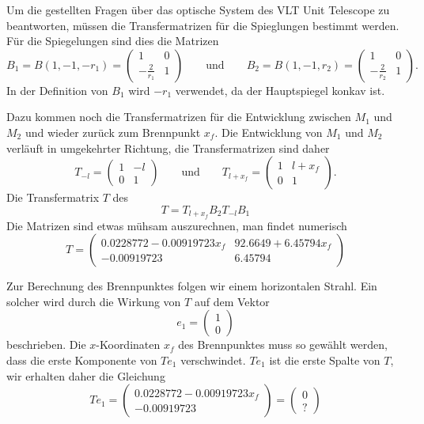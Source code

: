 \begin{loesung}
Um die gestellten Fragen über das optische System des VLT Unit Telescope
zu beantworten, müssen die Transfermatrizen für die Spieglungen 
bestimmt werden.
Für die Spiegelungen sind dies die Matrizen
\[
B_1=B(1,-1,-r_1)=
\begin{pmatrix}
1&0\\-\frac2{r_1}&1
\end{pmatrix}
\qquad\text{und}\qquad
B_2=B(1,-1,r_2)=
\begin{pmatrix}
1&0\\-\frac2{r_2}&1
\end{pmatrix}.
\]
In der Definition von $B_1$ wird $-r_1$ verwendet, da der Hauptspiegel
konkav ist.

Dazu kommen noch die Transfermatrizen für die Entwicklung zwischen 
$M_1$ und $M_2$ und wieder zurück zum Brennpunkt $x_f$.
Die Entwicklung von $M_1$ und $M_2$ verläuft in umgekehrter Richtung,
die Transfermatrizen sind daher
\[
T_{-l} = \begin{pmatrix} 1&-l\\0&1\end{pmatrix}
\qquad\text{und}\qquad
T_{l+x_f} = \begin{pmatrix} 1&l+x_f\\0&1\end{pmatrix}.
\]
Die Transfermatrix $T$ des 
\[
T
=
T_{l+x_f}B_2T_{-l}B_1
\]
Die Matrizen sind etwas mühsam auszurechnen, man findet numerisch
\[
T = \begin{pmatrix}
 0.0228772 - 0.00919723 x_f&
92.6649 + 6.45794 x_f
\\
-0.00919723 &
6.45794
\end{pmatrix}
\]
\begin{teilaufgaben}
\item
Zur Berechnung des Brennpunktes folgen wir einem horizontalen Strahl.
Ein solcher wird durch die Wirkung von $T$ auf dem Vektor
\[
e_1=\begin{pmatrix}1\\0\end{pmatrix}
\]
beschrieben.
Die $x$-Koordinaten $x_f$ des Brennpunktes muss so gewählt werden,
dass die erste  Komponente von $Te_1$ verschwindet.
$Te_1$ ist die erste Spalte von $T$, wir erhalten daher die Gleichung
\[
Te_1 = \begin{pmatrix}
 0.0228772 - 0.00919723 x_f\\
-0.00919723 
\end{pmatrix}
=\begin{pmatrix}0\\?\end{pmatrix}
\]
\end{teilaufgaben}
\end{loesung}
